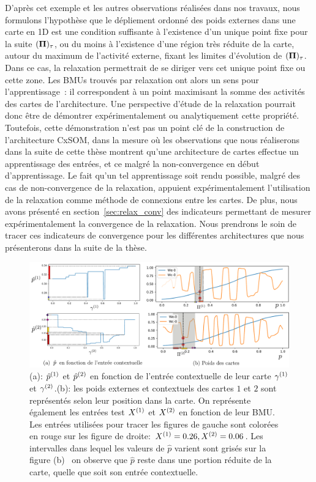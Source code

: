 \documentclass[../main]{subfiles}
\begin{document}
D'après cet exemple et les autres observations réalisées dans nos travaux, nous formulons l'hypothèse que le dépliement ordonné des poids externes dans une carte en 1D est une condition suffisante à l'existence d'un unique point fixe pour la suite $(\mathbf{\Pi})_\tau$, ou du moins à l'existence d'une région très réduite de la carte, autour du maximum de l'activité externe, fixant les limites d'évolution de $(\mathbf{\Pi})_\tau$.
Dans ce cas, la relaxation permettrait de se diriger vers cet unique point fixe ou cette zone.
Les BMUs trouvés par relaxation ont alors un sens pour l'apprentissage~: il correspondent à un point maximisant la somme des activités des cartes de l'architecture.
Une perspective d'étude de la relaxation pourrait donc être de démontrer expérimentalement ou analytiquement cette propriété. 
Toutefois, cette démonstration n'est pas un point clé de la construction de l'architecture CxSOM, dans la mesure où les observations que nous réaliserons dans la suite de cette thèse montrent qu'une architecture de cartes effectue un apprentissage des entrées, et ce malgré la non-convergence en début d'apprentissage. 
Le fait qu'un tel apprentissage soit rendu possible, malgré des cas de non-convergence de la relaxation, appuient expérimentalement l'utilisation de la relaxation comme méthode de connexions entre les cartes. 
De plus, nous avons présenté en section~\ref{sec:relax_conv} des indicateurs permettant de mesurer expérimentalement la convergence de la relaxation. Nous prendrons le soin de tracer ces indicateurs de convergence pour les différentes architectures que nous présenterons dans la suite de la thèse.


\begin{figure}
	\includegraphics[width=\textwidth]{am_w_006_noinp}
	\caption{(a): $\hat{p}^{({1})}$ et $\hat{p}^{({2})}$ en fonction de l'entrée contextuelle de leur carte $\gamma^{({1})}$ et $\gamma^{({2})}$.(b): les poids externes et contextuels des cartes $1$ et $2$ sont représentés selon leur position dans la carte. On représente également les entrées test $X^{({1})}$ et $X^{({2})}$ en fonction de leur BMU. Les entrées utilisées pour tracer les figures de gauche sont colorées en rouge sur les figure de droite: $X^{({1})}=0.26,X^{({2})}=0.06$. Les intervalles dans lequel les valeurs de $\hat{p}$ varient sont grisés sur la figure (b)~ on observe que $\hat{p}$ reste dans une portion réduite de la carte, quelle que soit son entrée contextuelle.}
	\label{fig:w006}
	\end{figure}
\end{document}
